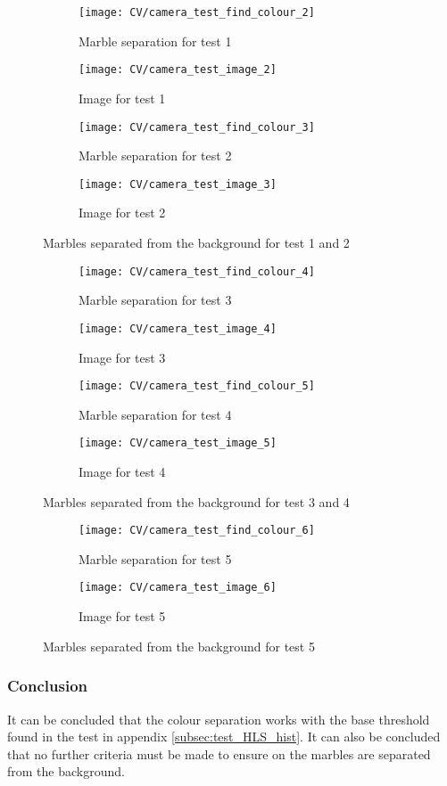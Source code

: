 \documentclass[../Head/Main.tex]{subfiles}
\begin{document}
\begin{figure}[H]
	\centering
	\begin{subfigure}[b]{0.245\textwidth}
		\centering
		\texttt{[image: CV/camera\_test\_find\_colour\_2]}
		\caption{Marble separation for test 1}
	\end{subfigure}
	\hfill
	\begin{subfigure}[b]{0.245\textwidth}
		\centering
		\texttt{[image: CV/camera\_test\_image\_2]}
		\caption{Image for test 1}
	\end{subfigure}
	\hfill 
	\begin{subfigure}[b]{0.245\textwidth}
		\centering
		\texttt{[image: CV/camera\_test\_find\_colour\_3]}
		\caption{Marble separation for test 2}
	\end{subfigure}
	\hfill
	\begin{subfigure}[b]{0.245\textwidth}
		\centering
		\texttt{[image: CV/camera\_test\_image\_3]}
		\caption{Image for test 2}
	\end{subfigure}
	\caption{Marbles separated from the background for test 1 and 2}
\end{figure}

\begin{figure}[H]
	\centering
	\begin{subfigure}[b]{0.245\textwidth}
		\centering
		\texttt{[image: CV/camera\_test\_find\_colour\_4]}
		\caption{Marble separation for test 3}
	\end{subfigure}
	\hfill
	\begin{subfigure}[b]{0.245\textwidth}
		\centering
		\texttt{[image: CV/camera\_test\_image\_4]}
		\caption{Image for test 3}
	\end{subfigure}
	\hfill 
	\begin{subfigure}[b]{0.245\textwidth}
		\centering
		\texttt{[image: CV/camera\_test\_find\_colour\_5]}
		\caption{Marble separation for test 4}
	\end{subfigure}
	\hfill
	\begin{subfigure}[b]{0.245\textwidth}
		\centering
		\texttt{[image: CV/camera\_test\_image\_5]}
		\caption{Image for test 4}
	\end{subfigure}
	\caption{Marbles separated from the background for test 3 and 4}
\end{figure}

\begin{figure}[H]
	\centering
	\begin{subfigure}[b]{0.49\textwidth}
		\centering
		\texttt{[image: CV/camera\_test\_find\_colour\_6]}
		\caption{Marble separation for test 5}
	\end{subfigure}
	\hfill
	\begin{subfigure}[b]{0.49\textwidth}
		\centering
		\texttt{[image: CV/camera\_test\_image\_6]}
		\caption{Image for test 5}
	\end{subfigure}
	\caption{Marbles separated from the background for test 5}
\end{figure}

\subsubsection*{Conclusion}
It can be concluded that the colour separation works with the base threshold found in the test in appendix \ref{subsec:test_HLS_hist}. It can also be concluded that no further criteria must be made to ensure on the marbles are separated from the background.
\end{document}
